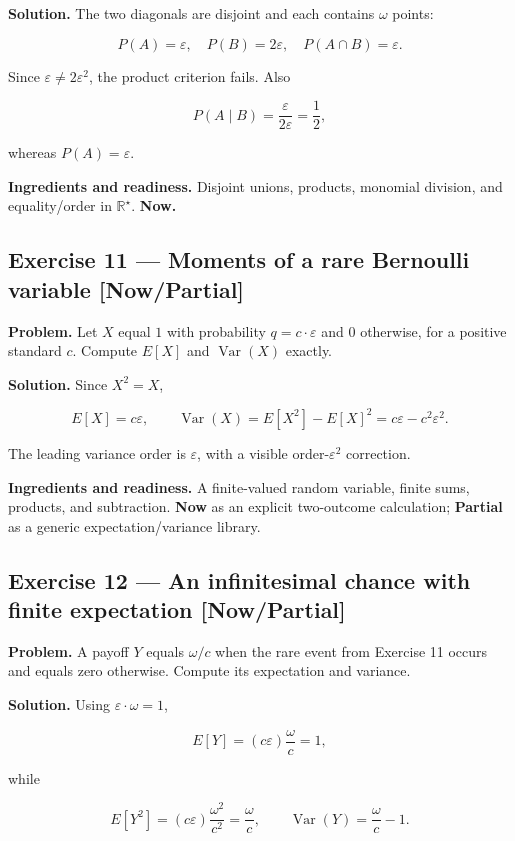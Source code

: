 \documentclass[11pt]{article}
\newcommand{\Rstar}{\mathbb{R}^{\star}}
\newcommand{\eps}{\varepsilon}
\renewcommand{\epsilon}{\varepsilon}
\newcommand{\Var}{\operatorname{Var}}
\begin{document}
\textbf{Solution.} The two diagonals are disjoint and each contains $\omega$ points:

\[
P(A)=\epsilon,
\quad P(B)=2\epsilon,
\quad P(A\cap B)=\epsilon.
\]

Since $\eps \neq  2\eps^2$, the product criterion fails. Also

\[
P(A\mid B)=\frac{\epsilon}{2\epsilon}=\frac12,
\]

whereas $P(A)=\eps$.

\textbf{Ingredients and readiness.} Disjoint unions, products, monomial division,
and equality/order in $\Rstar$. \textbf{Now.}


\subsection*{Exercise 11 --- Moments of a rare Bernoulli variable \hfill \normalfont\small[Now/Partial]}

\textbf{Problem.} Let $X$ equal $1$ with probability $q=c\cdot \eps$ and $0$
otherwise, for a positive standard $c$. Compute $E[X]$ and $\Var(X)$ exactly.

\textbf{Solution.} Since $X^2=X$,

\[
E[X]=c\epsilon,
\qquad
\operatorname{Var}(X)=E[X^2]-E[X]^2
=c\epsilon-c^2\epsilon^2.
\]

The leading variance order is $\eps$, with a visible order-$\eps^2$
correction.

\textbf{Ingredients and readiness.} A finite-valued random variable, finite sums,
products, and subtraction. \textbf{Now} as an explicit two-outcome calculation;
\textbf{Partial} as a generic expectation/variance library.


\subsection*{Exercise 12 --- An infinitesimal chance with finite expectation \hfill \normalfont\small[Now/Partial]}

\textbf{Problem.} A payoff $Y$ equals $\omega/c$ when the rare event from Exercise 11
occurs and equals zero otherwise. Compute its expectation and variance.

\textbf{Solution.} Using $\eps\cdot \omega=1$,

\[
E[Y]=(c\epsilon)\frac{\omega}{c}=1,
\]

while

\[
E[Y^2]=(c\epsilon)\frac{\omega^2}{c^2}=\frac{\omega}{c},
\qquad
\operatorname{Var}(Y)=\frac{\omega}{c}-1.
\]
\end{document}
